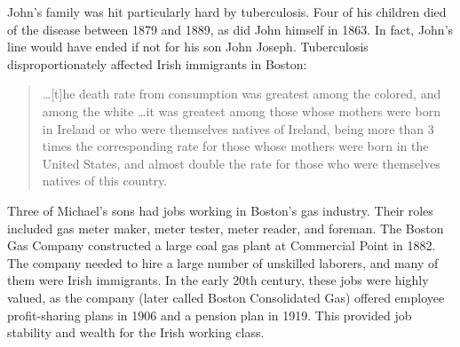 John's family was hit particularly hard by tuberculosis. %
Four of his children died of the disease between 1879 and 1889, as did John himself in 1863.\cite{John2OBrienDeath:1} In fact, John's line would have ended if not for his son John Joseph. Tuberculosis disproportionately affected Irish immigrants in Boston:

\begin{quote}
	\ldots[t]he death rate from consumption was greatest among the colored, and among the white \ldots it was greatest among those whose mothers were born in Ireland or who were themselves natives of Ireland, being more than 3 times the corresponding rate for those whose mothers were born in the United States, and almost double the rate for those who were themselves natives of this country.\cite{VitalStatistics}
\end{quote}

Three of Michael's sons had jobs working in Boston's gas industry. Their roles included gas meter maker, meter tester, meter reader, and foreman. The Boston Gas Company constructed a large coal gas plant at Commercial Point in 1882. The company needed to hire a large number of unskilled laborers, and many of them were Irish immigrants.\cite{Keating:11} In the early 20th century, these jobs were highly valued, as the company (later called Boston Consolidated Gas) offered employee profit-sharing plans in 1906 and a pension plan in 1919. This provided job stability and wealth for the Irish working class.\cite{Keating:20}

